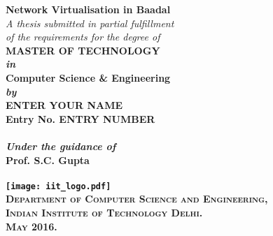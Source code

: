 \begin{titlepage}
\begin{center}

\LARGE{\textsf{\bfseries Network Virtualisation in Baadal}}\\
\vspace{20pt}
\normalsize
\emph{A thesis submitted in partial fulfillment} \\
\emph{of the requirements for the degree of} \\
\vspace{20pt}
\bfseries MASTER OF TECHNOLOGY \\
\vspace{20pt}
\emph {in}\\
\vspace{20pt}
\bfseries Computer Science \& Engineering \\
\vspace{20pt}
\emph {by}\\
\vspace{20pt}
\Large{\textsf{\bfseries ENTER YOUR NAME}} \\
{\normalsize \textsf{\bfseries Entry No. ENTRY NUMBER}}\\
\ \\
{\normalsize \emph {Under the guidance of}}
\ \\
\Large{\textsf{\bfseries Prof. S.C. Gupta}} \\
\ \\
\vspace{30pt}
\texttt{[image: iit\_logo.pdf]} \\
\vspace{10pt}
\large{\textsc{Department of Computer Science and Engineering,\\
Indian Institute of Technology Delhi.\\ May 2016.}}
\end{center}
\end{titlepage}
